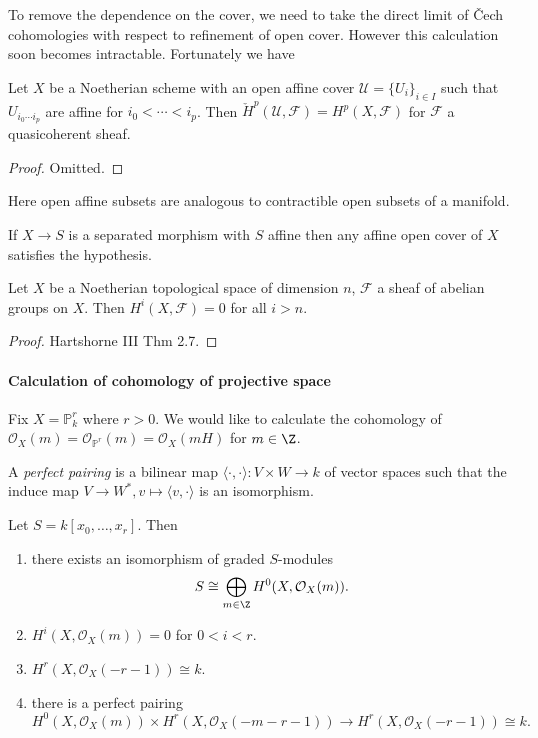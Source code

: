 \documentclass[a4paper]{article}
\renewcommand*{\P}{\mathbb{P}}
\newcommand{\sh}[1]{\mathcal{#1}} %
\begin{document}
To remove the dependence on the cover, we need to take the direct limit of Čech cohomologies with respect to refinement of open cover. However this calculation soon becomes intractable. Fortunately we have

\begin{theorem}
  Let \(X\) be a Noetherian scheme with an open affine cover \(\sh U = \{U_i\}_{i \in I}\) such that \(U_{i_0 \cdots i_p}\) are affine for \(i_0 < \cdots < i_p\). Then \(\check H^p(\mathcal U, \sh F) = H^p(X, \sh F)\) for \(\sh F\) a quasicoherent sheaf.
\end{theorem}

\begin{proof}
  Omitted.
\end{proof}

Here open affine subsets are analogous to contractible open subsets of a manifold.

\begin{remark}
  If \(X \to S\) is a separated morphism with \(S\) affine then any affine open cover of \(X\) satisfies the hypothesis.
\end{remark}

\begin{theorem}[Grothendieck]
  Let \(X\) be a Noetherian topological space of dimension \(n\), \(\sh F\) a sheaf of abelian groups on \(X\). Then \(H^i(X, \sh F) = 0\) for all \(i > n\).
\end{theorem}

\begin{proof}
  Hartshorne III Thm 2.7.
\end{proof}

\paragraph{Calculation of cohomology of projective space}

Fix \(X = \P_k^r\) where \(r > 0\). We would like to calculate the cohomology of \(\sh O_X(m) = \sh O_{\P^r}(m) = \sh O_X(mH)\) for \(m \in \Z\).

\begin{definition}
  A \emph{perfect pairing} is a bilinear map \(\langle \cdot, \cdot \rangle: V \times W \to k\) of vector spaces such that the induce map \(V \to W^*, v \mapsto \langle v, \cdot \rangle\) is an isomorphism.
\end{definition}

\begin{theorem}
  Let \(S = k[x_0, \dots, x_r]\). Then
  \begin{enumerate}
  \item there exists an isomorphism of graded \(S\)-modules
    \[
      S \cong \bigoplus_{m \in \Z} H^0(X, \sh O_X(m)).
    \]
  \item \(H^i(X, \sh O_X(m)) = 0\) for \(0 < i < r\).
  \item \(H^r(X, \sh O_X(-r - 1)) \cong k\).
  \item there is a perfect pairing
    \[
      H^0(X, \sh O_X(m)) \times H^r(X, \sh O_X(-m - r - 1)) \to H^r(X, \sh O_X(-r - 1)) \cong k.
    \]
  \end{enumerate}
\end{theorem}
\end{document}
